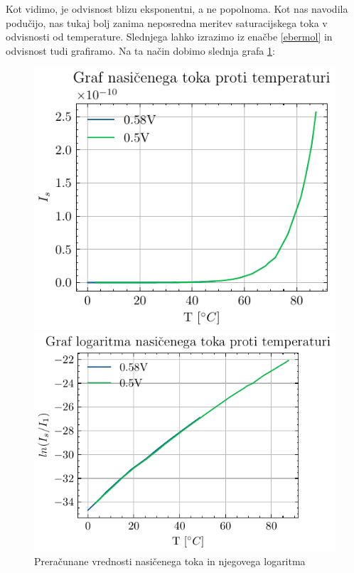 \documentclass[12pt]{article}
\begin{document}
Kot vidimo, je odvisnost blizu eksponentni, a ne popolnoma. Kot nas navodila podučijo, nas tukaj bolj zanima neposredna meritev saturacijskega toka v odvisnosti od temperature. Slednjega lahko izrazimo iz enačbe \ref{ebermol} in odvisnost tudi grafiramo. Na ta način dobimo slednja grafa \ref{is}:

\begin{figure}[ht]
    \centering
    \begin{minipage}[t]{0.42\textwidth}
        \includegraphics[width=\textwidth]{isodt.pdf}
    
    \end{minipage}
    \hfill
    \begin{minipage}[t]{0.48\textwidth}
        \includegraphics[width=\textwidth]{lnisodt.pdf}
    
    \end{minipage}
    \caption{Preračunane vrednosti nasičenega toka in njegovega logaritma}
    \label{is}
\end{figure}
\newpage
\end{document}
